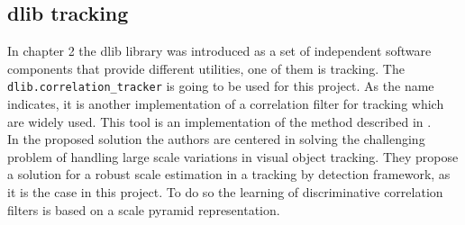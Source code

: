 \subsection{dlib tracking}
In chapter 2 the dlib library was introduced as a set of independent software components that provide different utilities, one of them is tracking. The \texttt{dlib.correlation\_tracker} is going to be used for this project. As the name indicates, it is another implementation of a correlation filter for tracking which are widely used. This tool is an implementation of the method described in \cite{danelljan2014accurate}.\\ In the proposed solution the authors are centered in solving the challenging problem of handling large scale variations in visual object tracking. They propose a solution for a robust scale estimation in a tracking by detection framework, as it is the case in this project. To do so the learning of discriminative correlation filters is based on a scale pyramid representation.
